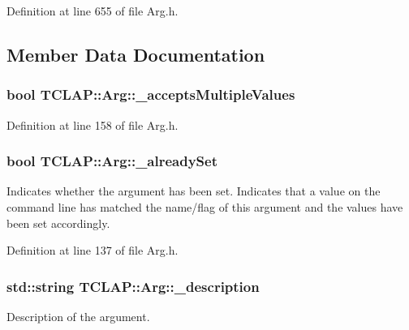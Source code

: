 Definition at line 655 of file Arg.\+h.



\subsection{Member Data Documentation}
\hypertarget{class_t_c_l_a_p_1_1_arg_a13130a9a5d22c57a6d42a8883c9b1e0f}{}
\subsubsection[{\+\_\+accepts\+Multiple\+Values}]{\setlength{\rightskip}{0pt plus 5cm}bool T\+C\+L\+A\+P\+::\+Arg\+::\+\_\+accepts\+Multiple\+Values\hspace{0.3cm}{\ttfamily [protected]}}\label{class_t_c_l_a_p_1_1_arg_a13130a9a5d22c57a6d42a8883c9b1e0f}


Definition at line 158 of file Arg.\+h.

\hypertarget{class_t_c_l_a_p_1_1_arg_a829e32129857d2683e5791a5df1208ec}{}
\subsubsection[{\+\_\+already\+Set}]{\setlength{\rightskip}{0pt plus 5cm}bool T\+C\+L\+A\+P\+::\+Arg\+::\+\_\+already\+Set\hspace{0.3cm}{\ttfamily [protected]}}\label{class_t_c_l_a_p_1_1_arg_a829e32129857d2683e5791a5df1208ec}
Indicates whether the argument has been set. Indicates that a value on the command line has matched the name/flag of this argument and the values have been set accordingly. 

Definition at line 137 of file Arg.\+h.

\hypertarget{class_t_c_l_a_p_1_1_arg_a9882fe256eaab01ac53db54ac657d272}{}
\subsubsection[{\+\_\+description}]{\setlength{\rightskip}{0pt plus 5cm}std\+::string T\+C\+L\+A\+P\+::\+Arg\+::\+\_\+description\hspace{0.3cm}{\ttfamily [protected]}}\label{class_t_c_l_a_p_1_1_arg_a9882fe256eaab01ac53db54ac657d272}
Description of the argument. 


